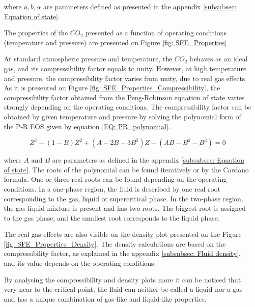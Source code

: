 \documentclass[../Article_Model_Parameters.tex]{subfiles}
\begin{document}
    where $a, b, \alpha$ are parameters defined as presented in the appendix \ref{subsubsec: Equation of state}.
    
    The properties of the $CO_2$ presented as a function of operating conditions (temperature and pressure) are presented on Figure \ref{fig: SFE_Properties}    
    
    At standard atmospheric pressure and temperature, the $CO_2$ behaves as an ideal gas, and its compressibility factor equals to unity.  However, at high temperature and pressure, the compressibility factor varies from unity, due to real gas effects. As it is presented on Figure \ref{fig: SFE_Properties_Compressibility}, the compressibility factor obtained from the Peng-Robinson equation of state varies strongly depending on the operating conditions. The compressibility factor can be obtained by given temperature and pressure by solving the polynomial form of the P-R EOS given by equation \ref{EQ: PR_polynomial}.

    {\footnotesize
    \begin{equation}
        Z^3 - (1-B)Z^2+(A-2B-3B^2)Z -(AB-B^2-B^3) = 0
        \label{EQ: PR_polynomial}
    \end{equation}
    }

    where $A$ and $B$ are parameters as defined in the appendix \ref{subsubsec: Equation of state}. The roots of the polynomial can be found iteratively or by the Cardano formula. One or three real roots can be found depending on the operating conditions. In a one-phase region, the fluid is described by one real root corresponding to the gas, liquid or supercritical phase. In the two-phase region, the gas-liquid mixture is present and has two roots. The biggest root is assigned to the gas phase, and the smallest root corresponds to the liquid phase.

 	The real gas effects are also visible on the density plot presented on the Figure \ref{fig: SFE_Properties_Density}. The density calculations are based on the compressibility factor, as explained in the appendix \ref{subsubsec: Fluid density}, and its value depends on the operating conditions. 
    
    By analysing the compressibility and density plots more it can be noticed that very near to the critical point, the fluid can neither be called a liquid nor a gas and has a unique combination of gas-like and liquid-like properties. 
\end{document}
